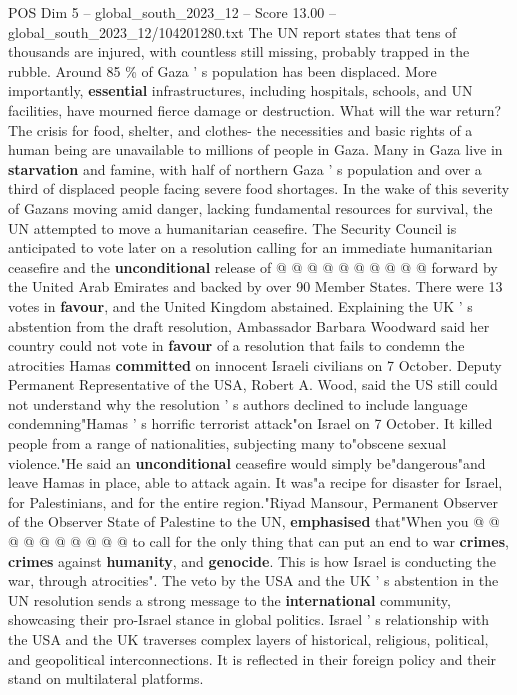 \begin{textsample}{POS Dim 5 – global\_south\_2023\_12 – Score 13.00 – global\_south\_2023\_12/104201280.txt}
The UN report states that tens of thousands are injured, with countless still missing, probably trapped in the rubble.
Around 85 \% of Gaza ' s population has been displaced.
More importantly, \textbf{essential} infrastructures, including hospitals, schools, and UN facilities, have mourned fierce damage or destruction.
What will the war return?
The crisis for food, shelter, and clothes- the necessities and basic rights of a human being are unavailable to millions of people in Gaza.
Many in Gaza live in \textbf{starvation} and famine, with half of northern Gaza ' s population and over a third of displaced people facing severe food shortages.
In the wake of this severity of Gazans moving amid danger, lacking fundamental resources for survival, the UN attempted to move a humanitarian ceasefire.
The Security Council is anticipated to vote later on a resolution calling for an immediate humanitarian ceasefire and the \textbf{unconditional} release of @ @ @ @ @ @ @ @ @ @ forward by the United Arab Emirates and backed by over 90 Member States.
There were 13 votes in \textbf{favour}, and the United Kingdom abstained.
Explaining the UK ' s abstention from the draft resolution, Ambassador Barbara Woodward said her country could not vote in \textbf{favour} of a resolution that fails to condemn the atrocities Hamas \textbf{committed} on innocent Israeli civilians on 7 October.
Deputy Permanent Representative of the USA, Robert A.
Wood, said the US still could not understand why the resolution ' s authors declined to include language condemning"Hamas ' s horrific terrorist attack"on Israel on 7 October.
It killed people from a range of nationalities, subjecting many to"obscene sexual violence."He said an \textbf{unconditional} ceasefire would simply be"dangerous"and leave Hamas in place, able to attack again.
It was"a recipe for disaster for Israel, for Palestinians, and for the entire region."Riyad Mansour, Permanent Observer of the Observer State of Palestine to the UN, \textbf{emphasised} that"When you @ @ @ @ @ @ @ @ @ @ to call for the only thing that can put an end to war \textbf{crimes}, \textbf{crimes} against \textbf{humanity}, and \textbf{genocide}.
This is how Israel is conducting the war, through atrocities".
The veto by the USA and the UK ' s abstention in the UN resolution sends a strong message to the \textbf{international} community, showcasing their pro-Israel stance in global politics.
Israel ' s relationship with the USA and the UK traverses complex layers of historical, religious, political, and geopolitical interconnections.
It is reflected in their foreign policy and their stand on multilateral platforms.

\end{textsample}
